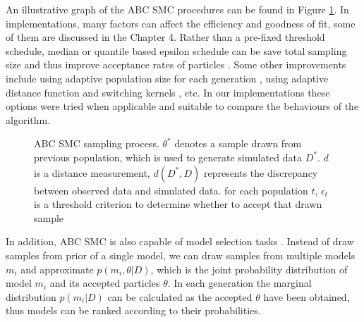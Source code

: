 \documentclass[12pt,a4paper]{report}
\begin{document}
An illustrative graph of the ABC SMC procedures can be found in Figure \ref{fig:smc}. In implementations, many factors can affect the efficiency and goodness of fit, some of them are discussed in the Chapter 4. Rather than a pre-fixed threshold schedule, median or quantile based epsilon schedule can be save total sampling size and thus improve acceptance rates of particles \cite{threshold}. Some other improvements include using adaptive population size for each generation \cite{population}, using adaptive distance function \cite{ref:adpt_dis} and switching kernels \cite{ref:kernel}, etc. In our implementations these options were tried when applicable and suitable to compare the behaviours of the algorithm.

\begin{figure}[t]
    \begin{center}
    \end{center}

    \caption[ABC SMC sampling process]%
    {ABC SMC sampling process. $\theta^*$ denotes a sample drawn from previous population, which is used to generate simulated data $D^*$. $d$ is a distance measurement, $d(D^*,D)$ represents the discrepancy between observed data and simulated data. for each population $t$, $\epsilon_t$ is a threshold criterion to determine whether to accept that drawn sample}
    \label{fig:smc}

\end{figure}

In addition, ABC SMC is also capable of model selection tasks \cite{model_compare}. Instead of draw samples from prior of a single model, we can draw samples from multiple models $m_i$ and approximate $p(m_i, \theta|D)$, which is the joint probability distribution of model $m_i$ and its accepted particles $\theta$. In each generation the marginal distribution $p(m_i|D)$ can be calculated as the accepted ${\theta}$ have been obtained, thus models can be ranked according to their probabilities.
\end{document}
